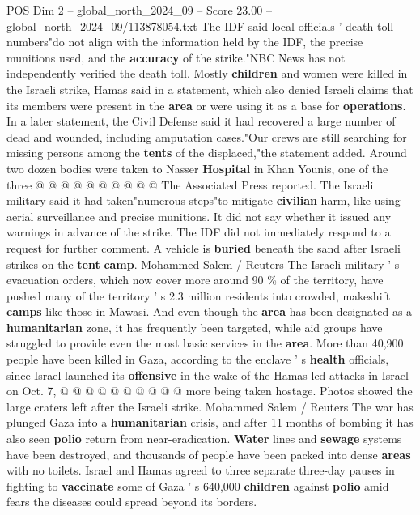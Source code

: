 \begin{textsample}{POS Dim 2 – global\_north\_2024\_09 – Score 23.00 – global\_north\_2024\_09/113878054.txt}
The IDF said local officials ' death toll numbers"do not align with the information held by the IDF, the precise munitions used, and the \textbf{accuracy} of the strike."NBC News has not independently verified the death toll.
Mostly \textbf{children} and women were killed in the Israeli strike, Hamas said in a statement, which also denied Israeli claims that its members were present in the \textbf{area} or were using it as a base for \textbf{operations}.
In a later statement, the Civil Defense said it had recovered a large number of dead and wounded, including amputation cases."Our crews are still searching for missing persons among the \textbf{tents} of the displaced,"the statement added.
Around two dozen bodies were taken to Nasser \textbf{Hospital} in Khan Younis, one of the three @ @ @ @ @ @ @ @ @ @ The Associated Press reported.
The Israeli military said it had taken"numerous steps"to mitigate \textbf{civilian} harm, like using aerial surveillance and precise munitions.
It did not say whether it issued any warnings in advance of the strike.
The IDF did not immediately respond to a request for further comment.
A vehicle is \textbf{buried} beneath the sand after Israeli strikes on the \textbf{tent} \textbf{camp}.
Mohammed Salem / Reuters The Israeli military ' s evacuation orders, which now cover more around 90 \% of the territory, have pushed many of the territory ' s 2.3 million residents into crowded, makeshift \textbf{camps} like those in Mawasi.
And even though the \textbf{area} has been designated as a \textbf{humanitarian} zone, it has frequently been targeted, while aid groups have struggled to provide even the most basic services in the \textbf{area}.
More than 40,900 people have been killed in Gaza, according to the enclave ' s \textbf{health} officials, since Israel launched its \textbf{offensive} in the wake of the Hamas-led attacks in Israel on Oct. 7, @ @ @ @ @ @ @ @ @ @ more being taken hostage.
Photos showed the large craters left after the Israeli strike.
Mohammed Salem / Reuters The war has plunged Gaza into a \textbf{humanitarian} crisis, and after 11 months of bombing it has also seen \textbf{polio} return from near-eradication. \textbf{Water} lines and \textbf{sewage} systems have been destroyed, and thousands of people have been packed into dense \textbf{areas} with no toilets.
Israel and Hamas agreed to three separate three-day pauses in fighting to \textbf{vaccinate} some of Gaza ' s 640,000 \textbf{children} against \textbf{polio} amid fears the diseases could spread beyond its borders.

\end{textsample}
